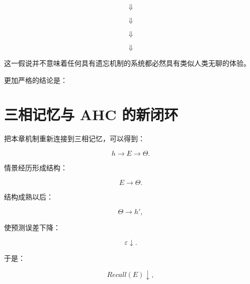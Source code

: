 \[
\Downarrow
\]

\begin{statementbox}
\centering
{}
\end{statementbox}

\[
\Downarrow
\]

\begin{statementbox}
\centering
{}
\end{statementbox}

\[
\Downarrow
\]

\begin{statementbox}
\centering
{}
\end{statementbox}

\[
\Downarrow
\]

\begin{statementbox}
\centering
{}
\end{statementbox}

这一假说并不意味着任何具有遗忘机制的系统都必然具有类似人类无聊的体验。

更加严格的结论是：

\begin{statementbox}
\centering
{}
\end{statementbox}

\section{三相记忆与 AHC 的新闭环}

把本章机制重新连接到三相记忆，可以得到：

\[
h
\rightarrow
E
\rightarrow
\Theta.
\]

情景经历形成结构：

\[
E\rightarrow\Theta.
\]

结构成熟以后：

\[
\Theta\rightarrow h',
\]

使预测误差下降：

\[
\varepsilon\downarrow.
\]

于是：

\[
Recall(E)\downarrow,
\]

